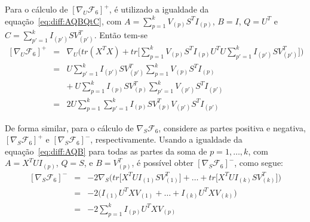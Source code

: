 \documentclass[
    12pt,                %
    oneside,            %
    a4paper,            %
    english,            %
    brazil                %
    ]{abntex2ppgsi}
\begin{document}
Para o cálculo de $[\nabla_U \mathcal{F}_6]^+$, é utilizado a igualdade da equação~\ref{eq:diff:AQBQtC}, com $A = \sum_{p=1}^{k} V_{(p)} S^T I_{(p)}$, $B = I$, $Q = U^T$ e $C = \sum_{p'=1}^{k}I_{(p')}SV_{(p')}^T$. Então tem-se
\[
    \begin{array}{lcl}
        [\nabla_U \mathcal{F}_6]^+ & = & \nabla_U \Big( tr(X^TX) + tr\big[ \sum_{p=1}^{k} V_{(p)} S^T I_{(p)} U^T U \sum_{p'=1}^k I_{(p')} S V_{(p')}^T \big] \Big) \\
                                   & = & U \sum_{p'=1}^k I_{(p')} S V_{(p')}^T \sum_{p=1}^{k} V_{(p)} S^T I_{(p)} \\
                                   &   & + ~ U \sum_{p=1}^k I_{(p)} S V_{(p)}^T \sum_{p'=1}^{k} V_{(p')} S^T I_{(p')} \\
                                   & = & 2 U \sum_{p=1}^k \sum_{p'=1}^{k} I_{(p)} S V_{(p)}^T V_{(p')} S^T I_{(p')}
    \end{array}
\]

De forma similar, para o cálculo de $\nabla_S \mathcal{F}_6$, considere as partes positiva e negativa, $[\nabla_S \mathcal{F}_6]^+$ e $[\nabla_S \mathcal{F}_6]^-$, respectivamente.
Usando a igualdade da equação~\ref{eq:diff:AQB} para todas as partes da soma de $p = 1, \dots, k$, com $A = X^T U I_{(p)}$, $Q = S$, e $B = V_{(p)}^T$, é possível obter $[\nabla_S \mathcal{F}_6]^-$, como segue:
\[
    \begin{array}{lcl}
        [\nabla_S \mathcal{F}_6]^- & = & - 2 \nabla_S \Big( tr\big[ X^T U I_{(1)}SV_{(1)}^T \big] + \dots + tr\big[ X^T U I_{(k)}SV_{(k)}^T \big] \Big) \\
                                   & = & - 2 \Big( I_{(1)} U^T X V_{(1)} + \dots + I_{(k)} U^T X V_{(k)} \Big) \\
                                   & = & - 2 \sum_{p=1}^{k} I_{(p)} U^T X V_{(p)}
    \end{array}
\]
\end{document}
